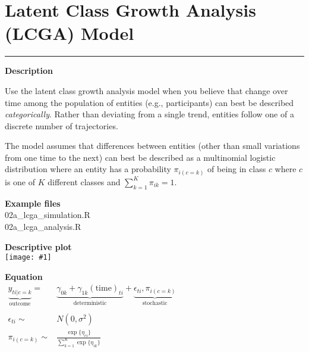 \documentclass[10pt, landscape, article]{memoir}
\newcommand{\outcome}[1]{\underbrace{#1}_{\text{outcome}}}
\newcommand{\deterministic}[1]{\underbrace{#1}_{\text{deterministic}}}
\newcommand{\stochastic}[1]{\underbrace{#1}_{\text{stochastic}}}
\newenvironment{desc}{
    \begin{minipage}[t][.6\textheight][t]{.9\textwidth}
    \setlength{\parskip}{.5\baselineskip}
    \textbf{\large Description}\\\raggedright
}{
    \end{minipage}
}
\newenvironment{eqn}{
    \begin{minipage}[t][.39\textheight][t]{\textwidth}
    \textbf{\large Equation}\\
}{
    \end{minipage}
}
\newcommand{\datafig}[1]{
    \begin{minipage}[t][.6\textheight][t]{\textwidth}%
    \textbf{\large Descriptive plot}\\
    \texttt{[image: \#1]}%
    \end{minipage}
}
\newenvironment{files}{
    \begin{minipage}[t][.2\textheight][t]{\textwidth}
    \textbf{\large Example files}\\
}{
    \end{minipage}
}
\begin{document}
\chapter{Latent Class Growth Analysis (LCGA) Model}
\label{lcga}
\rule[\baselineskip]{\textwidth}{3pt}
\begin{minipage}[t][.9\textheight][t]{.4\textwidth}
\begin{desc}
Use the latent class growth analysis model when you believe that change over time among the population of entities (e.g., participants) can best be described \emph{categorically}. Rather than deviating from a single trend, entities follow one of a discrete number of trajectories.

The model assumes that differences between entities (other than small variations from one time to the next) can best be described as a multinomial logistic distribution where an entity has a probability $\pi_{i(c{=}k)}$ of being in class $c$ where $c$ is one of $K$ different classes and $\sum^K_{k{=}1}\pi_{ik}=1$.
\end{desc}
\begin{files}
02a\_lcga\_simulation.R\\02a\_lcga\_analysis.R
\end{files}
\end{minipage} %
\begin{minipage}[t][.9\textheight][t]{.6\textwidth}
\datafig{lcga.pdf}
\begin{eqn}
$\begin{array}{rl}
\outcome{y_{ti|c=k}} = & 
\deterministic{\gamma_{0k} + \gamma_{1k}(\text{time})_{ti}} + 
\stochastic{\epsilon_{ti}, \pi_{i(c=k)}} \\
&\\
\epsilon_{ti} \sim & N(0, \sigma^2) \\
\pi_{i(c=k)} \sim & \frac{\exp\{\eta_{ci}\}}{\sum^K_{k=1}\exp\{\eta_{ik}\}}
\end{array}$
\end{eqn}
\end{minipage}
\newpage

\end{document}
